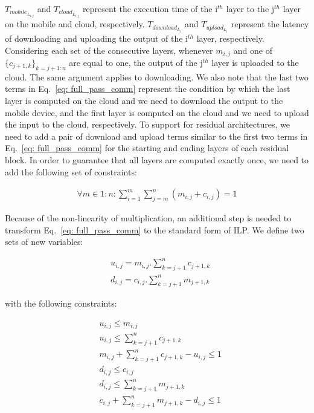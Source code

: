 $T_{mobile_{L_{i,j}}}$ and $T_{cloud_{L_{i,j}}}$ represent the execution time of the i$^{th}$ layer to the j$^{th}$ layer on the mobile and cloud, respectively. $T_{download_{L_i}}$ and $T_{upload_{L_i}}$ represent the latency of downloading and uploading the output of the i$^{th}$ layer, respectively. Considering each set of the consecutive layers, whenever $m_{i,j}$ and one of $\{c_{j+1,k}\}_{k=j+1:n}$ are equal to one, the output of the j$^{th}$ layer is uploaded to the cloud. The same argument applies to downloading.
We also note that the last two terms in Eq.~\ref{eq: full_pass_comm} represent the condition by which the last layer is computed on the cloud and we need to download the output to the mobile device, and the first layer is computed on the cloud and we need to upload the input to the cloud, respectively. To support for residual architectures, we need to add a pair of download and upload terms similar to the first two terms in Eq.~\ref{eq: full_pass_comm} for the starting and ending layers of each residual block. In order to guarantee that all layers are computed exactly once, we need to add the following set of constraints:

\begin{equation}
	\begin{split}
		\forall m \in {1:n}: \sum_{i=1}^{m}{\sum_{j=m}^{n}{(m_{i,j} + c_{i,j})}} = 1
  	\end{split}
\end{equation}

Because of the non-linearity of multiplication, an additional step is needed to transform Eq.~\ref{eq: full_pass_comm} to the standard form of ILP. We define two sets of new variables:

\begin{equation}
\label{eq: download_upload_binary_var} 
	\begin{aligned}
      &u_{i,j} = m_{i,j}.\sum_{k=j+1}^{n}{c_{j+1,k}} \\
      &d_{i,j} = c_{i,j}.\sum_{k=j+1}^{n}{m_{j+1,k}}
     \end{aligned}
\end{equation}

with the following constraints:

\begin{equation}\label{eq: download_upload_constraints} 
	\begin{aligned}
      &u_{i,j} \leq m_{i,j}\\
      &u_{i,j} \leq \sum_{k=j+1}^{n}{c_{j+1,k}} \\
      &m_{i,j} + \sum_{k=j+1}^{n}{c_{j+1,k}} - u_{i,j} \leq 1\\
      &d_{i,j} \leq c_{i,j}\\
      &d_{i,j} \leq \sum_{k=j+1}^{n}{m_{j+1,k}} \\
      &c_{i,j} + \sum_{k=j+1}^{n}{m_{j+1,k}} - d_{i,j} \leq 1
	\end{aligned}
\end{equation}

